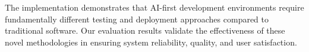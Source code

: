 The implementation demonstrates that AI-first development environments require fundamentally different testing and deployment approaches compared to traditional software. Our evaluation results validate the effectiveness of these novel methodologies in ensuring system reliability, quality, and user satisfaction.
